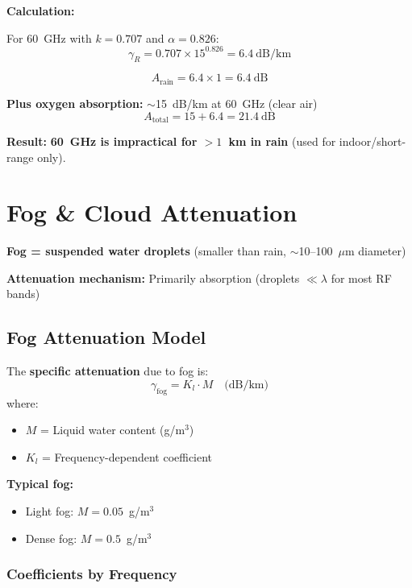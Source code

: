 \textbf{Calculation:}

For 60~GHz with $k = 0.707$ and $\alpha = 0.826$:
\begin{equation}
\gamma_R = 0.707 \times 15^{0.826} = 6.4~\text{dB/km}
\end{equation}

\begin{equation}
A_{\text{rain}} = 6.4 \times 1 = 6.4~\text{dB}
\end{equation}

\textbf{Plus oxygen absorption:} $\sim$15~dB/km at 60~GHz (clear air)
\begin{equation}
A_{\text{total}} = 15 + 6.4 = 21.4~\text{dB}
\end{equation}

\textbf{Result:} \textbf{60~GHz is impractical for $>1$~km in rain} (used for indoor/short-range only).

\section{Fog \& Cloud Attenuation}

\textbf{Fog = suspended water droplets} (smaller than rain, $\sim$10--100~$\mu$m diameter)

\textbf{Attenuation mechanism:} Primarily absorption (droplets $\ll \lambda$ for most RF bands)

\subsection{Fog Attenuation Model}

The \textbf{specific attenuation} due to fog is:
\begin{equation}
\gamma_{\text{fog}} = K_l \cdot M \quad \text{(dB/km)}
\end{equation}
where:
\begin{itemize}
\item $M$ = Liquid water content (g/m$^3$)
\item $K_l$ = Frequency-dependent coefficient
\end{itemize}

\textbf{Typical fog:}
\begin{itemize}
\item Light fog: $M = 0.05$~g/m$^3$
\item Dense fog: $M = 0.5$~g/m$^3$
\end{itemize}

\subsubsection{Coefficients by
Frequency}\label{coefficients-by-frequency-1}

